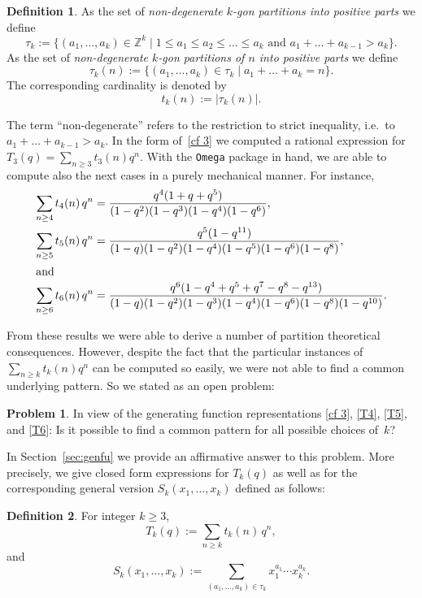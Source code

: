\documentclass[reqno]{amsart}
\theoremstyle{plain}
\theoremstyle{definition}
\newtheorem{definition}{Definition}
\newtheorem{problem}{Problem}
\theoremstyle{remark}
\begin{document}
\begin{definition} As the set of \textit{non-degenerate $k$-gon partitions
into positive parts} we define
\[
\tau_k:=\{(a_1,\dots,a_k)\in \mathbb{Z}^k \mid
1\leq a_1 \leq a_2 \leq \dots \leq a_k \text{ and }
a_1+\dots +a_{k-1}> a_k \}.
\]
As the set of \textit{non-degenerate $k$-gon partitions of $n$ into positive
parts} we define
\[
\tau_k(n):=\{(a_1,\dots,a_k)\in \tau_k \mid
a_1+\dots + a_{k}=n \}.
\]
The corresponding cardinality is denoted by
\[
t_k(n):=| \tau_k(n) |.
\]
\end{definition}

The term ``non-degenerate'' refers to the restriction to strict
inequality, i.e.\ to $a_1+\dots +a_{k-1}> a_k$. In the form
of~\eqref{cf 3} we computed a rational expression
for $T_3(q)=\sum_{n\ge 3} t_3(n) q^n$.
With the \texttt{Omega} package in hand, we are able to compute
also the next cases in a purely mechanical manner. For instance,
\begin{align} \label{T4}
\sum_{n\ge 4} t_4(n) \, q^n & =
\frac{q^4 (1+q+q^5)}{(1-q^2)(1-q^3)(1-q^4)(1-q^6)},\\
\label{T5}
\sum_{n\ge 5} t_5(n) \, q^n & =
\frac{q^5(1-q^{11})}{(1-q)(1-q^2)(1-q^4)(1-q^5)(1-q^6)(1-q^8)},\\
\intertext{and}
\label{T6}
\sum_{n\ge 6} t_6(n) \, q^n &=
\frac{q^6(1-q^4+q^5+q^7-q^8-q^{13})}
{(1-q)(1-q^2)(1-q^3)(1-q^4)(1-q^6)(1-q^8)(1-q^{10})}.
\end{align}

\medskip
{}From these results we were able to derive a number
of partition theoretical consequences.
However, despite the fact that the particular instances of
$\sum_{n \ge k} t_k(n) q^n$ can be computed so
easily, we were not able to find a common underlying
pattern. So we stated as an open problem:

\begin{problem} \label{open}
In view of the generating function representations
\eqref{cf 3}, \eqref{T4}, \eqref{T5}, and \eqref{T6}: Is it
possible to find a common pattern for all possible
choices of~$k$?
\end{problem}

In Section~\ref{sec:genfu} we provide an affirmative answer to this
problem. More precisely, we give closed form expressions
for $T_k(q)$ as well as for the
corresponding general version $S_k(x_1,\dots,x_k)$
defined as follows:

\begin{definition} For integer $k\ge 3$,
\[
T_k(q):= \sum_{n\ge k} t_k(n) \, q^n,
\]
and
\[
S_k(x_1,\dots,x_k):=
\sum_{(a_1,\dots,a_k)\in \tau_k} x_1^{a_1}\cdots x_k^{a_k}.
\]
\end{definition}
\end{document}
